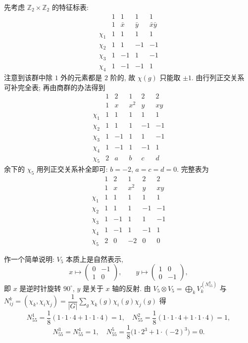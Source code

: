 先考虑 $\mathbb{Z}_2\times\mathbb{Z}_2$ 的特征标表:
\[
\begin{array}{c|cccc}
  & 1 & 1 & 1 & 1\\
  & 1 & \bar x & \bar y & \bar x\bar y\\ \hline
  \chi_1 & 1 & 1 & 1 & 1\\
  \chi_2 & 1 & 1 & -1 & -1\\
  \chi_3 & 1 & -1 & 1 & -1\\
  \chi_4 & 1 & -1 & -1 & 1
\end{array}
\]
注意到该群中除 $1$ 外的元素都是 $2$ 阶的, 故 $\chi(g)$ 只能取 $\pm1$. 由行列正交关系
可补完全表; 再由商群的办法得到
\[
\begin{array}{c|ccccc}
  & 1 & 2 & 1 & 2 & 2\\
  & 1 & x & x^2 & y & xy\\ \hline
  \chi_1 & 1 & 1 & 1 & 1 & 1\\
  \chi_2 & 1 & 1 & 1 & -1 & -1\\
  \chi_3 & 1 & -1 & 1 & 1 & -1\\
  \chi_4 & 1 & -1 & 1 & -1 & 1\\
  \chi_5 & 2 & a & b & c & d
\end{array}
\]
余下的 $\chi_5$ 用列正交关系补全即可: $b=-2$, $a=c=d=0$. 完整表为
\[
\begin{array}{c|ccccc}
  & 1 & 2 & 1 & 2 & 2\\
  & 1 & x & x^2 & y & xy\\ \hline
  \chi_1 & 1 & 1 & 1 & 1 & 1\\
  \chi_2 & 1 & 1 & 1 & -1 & -1\\
  \chi_3 & 1 & -1 & 1 & 1 & -1\\
  \chi_4 & 1 & -1 & 1 & -1 & 1\\
  \chi_5 & 2 & 0 & -2 & 0 & 0
\end{array}
\]

作一个简单说明: $V_5$ 本质上是自然表示,
\[
  x\mapsto\begin{pmatrix}0&-1\\1&0\end{pmatrix},\qquad
  y\mapsto\begin{pmatrix}1&0\\0&-1\end{pmatrix},
\]
即 $x$ 是逆时针旋转 $90^\circ$, $y$ 是关于 $x$ 轴的反射. 由
$V_5\otimes V_5=\bigoplus_k V_k^{(N_{55}^k)}$ 与
$N_{ij}^k=(\chi_k,\chi_i\chi_j)=\dfrac{1}{|G|}\sum_g\chi_k(g)\chi_i(g)\chi_j(g)$ 得
\[
  N_{55}^1=\frac18(1\cdot1\cdot4+1\cdot1\cdot4)=1,\quad
  N_{55}^2=\frac18(1\cdot1\cdot4+1\cdot1\cdot4)=1,
\]
\[
  N_{55}^3=N_{55}^4=1,\quad
  N_{55}^5=\frac18\bigl(1\cdot2^3+1\cdot(-2)^3\bigr)=0 .
\]

